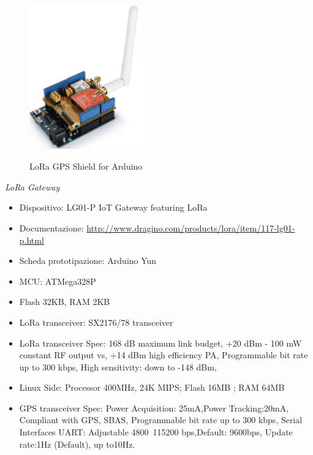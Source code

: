 \documentclass[12pt,a4paper,openright,twoside]{report}
\begin{document}
\begin{figure}[h]                      
\begin{center} 
\includegraphics[width=50mm,height=70mm]{LoRa_Shield.png}
\caption[LoRa GPS Shield for Arduino]{LoRa GPS Shield for Arduino}\label{fig:prima}
\end{center}
\end{figure}

\textit{LoRa Gateway}
\begin{itemize}
    \item Dispositivo: LG01-P IoT Gateway featuring LoRa
    \item Documentazione: \url{http://www.dragino.com/products/lora/item/117-lg01-p.html}
    \item Scheda prototipazione: Arduino Yun
    \item MCU: ATMega328P
    \item Flash 32KB, RAM 2KB
    \item LoRa transceiver: SX2176/78 transceiver
    \item LoRa transceiver Spec: 168 dB maximum link budget, +20 dBm - 100 mW constant RF output vs, +14 dBm high efficiency PA, Programmable bit rate up to 300 kbps, High sensitivity: down to -148 dBm, 
    \item Linux Side: Processor 400MHz, 24K MIPS; Flash 16MB ; RAM 64MB
    \item GPS transceiver Spec: Power Acquisition: 25mA,Power Tracking:20mA, Compliant with GPS, SBAS, Programmable bit rate up to 300 kbps, Serial Interfaces UART: Adjustable 4800~115200 bps,Default: 9600bps, Update rate:1Hz (Default), up to10Hz.
\end{itemize}
\end{document}
